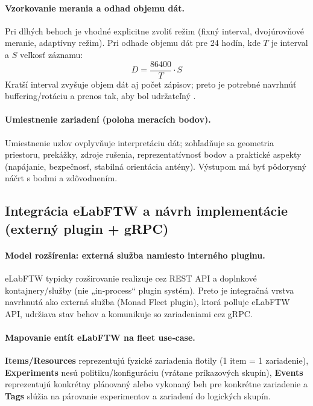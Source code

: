 \paragraph{Vzorkovanie merania a odhad objemu dát.}
Pri dlhých behoch je vhodné explicitne zvoliť režim (fixný interval, dvojúrovňové meranie, adaptívny režim).
Pri odhade objemu dát pre 24 hodín, kde $T$ je interval a $S$ veľkosť záznamu:
\begin{equation}
D = \frac{86400}{T} \cdot S
\end{equation}
Kratší interval zvyšuje objem dát aj počet zápisov; preto je potrebné navrhnúť buffering/rotáciu a prenos tak, aby bol udržateľný \cite{flash_wear_note}.

\paragraph{Umiestnenie zariadení (poloha meracích bodov).}
Umiestnenie uzlov ovplyvňuje interpretáciu dát; zohľadňuje sa geometria priestoru, prekážky, zdroje rušenia, reprezentatívnosť bodov
a praktické aspekty (napájanie, bezpečnosť, stabilná orientácia antény). Výstupom má byť pôdorysný náčrt s bodmi a zdôvodnením.

\subsection{Integrácia eLabFTW a návrh implementácie (externý plugin + gRPC)}
\label{subsec:integration-grpc}

\paragraph{Model rozšírenia: externá služba namiesto interného pluginu.}
eLabFTW typicky rozširovanie realizuje cez REST API a doplnkové kontajnery/služby (nie „in‑process“ plugin systém).
Preto je integračná vrstva navrhnutá ako externá služba (Monad Fleet plugin), ktorá polluje eLabFTW API, udržiava stav behov a komunikuje so zariadeniami cez gRPC.

\paragraph{Mapovanie entít eLabFTW na fleet use‑case.}
\textbf{Items/Resources} reprezentujú fyzické zariadenia flotily (1 item = 1 zariadenie), \textbf{Experiments} nesú politiku/konfiguráciu (vrátane príkazových skupín),
\textbf{Events} reprezentujú konkrétny plánovaný alebo vykonaný beh pre konkrétne zariadenie a \textbf{Tags} slúžia na párovanie experimentov a zariadení do logických skupín.

